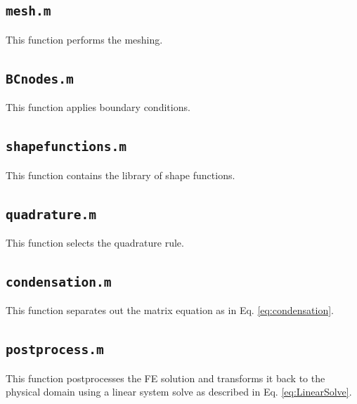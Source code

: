 \documentclass[10pt]{article}
\begin{document}
\subsection{\texttt{mesh.m}}
This function performs the meshing.


\subsection{\texttt{BCnodes.m}}
This function applies boundary conditions.


\subsection{\texttt{shapefunctions.m}}
This function contains the library of shape functions.


\subsection{\texttt{quadrature.m}}
This function selects the quadrature rule.


\subsection{\texttt{condensation.m}}
This function separates out the matrix equation as in Eq. \eqref{eq:condensation}.


\subsection{\texttt{postprocess.m}}
This function postprocesses the FE solution and transforms it back to the physical domain using a linear system solve as described in Eq. \eqref{eq:LinearSolve}.

\end{document}

